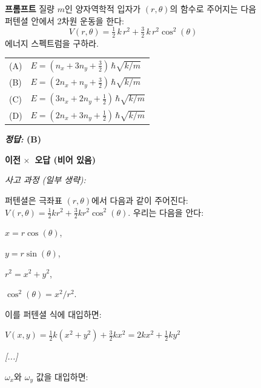 \begin{figure}[t]
\scriptsize
\begin{mdframed}[style=promptbox]
\noindent\textbf{프롬프트}
\vspace{2pt}\noindent
질량 $m$인 양자역학적 입자가 $(r, \theta)$의 함수로 주어지는 다음 퍼텐셜 안에서 2차원 운동을 한다:
%
\[
V(r, \theta) = \tfrac{1}{2}\,k\,r^2 + \tfrac{3}{2}\,k\,r^2\cos^2(\theta)
\]
%
에너지 스펙트럼을 구하라.

\vspace{2pt}
\noindent
\begin{tabular}{@{}ll@{}}
(A) & $E = (n_x + 3n_y + \tfrac{3}{2})\,\hbar\sqrt{k/m}$ \\[2pt]
(B) & $E = (2n_x + n_y + \tfrac{3}{2})\,\hbar\sqrt{k/m}$ \\[2pt]
(C) & $E = (3n_x + 2n_y + \tfrac{1}{2})\,\hbar\sqrt{k/m}$ \\[2pt]
(D) & $E = (2n_x + 3n_y + \tfrac{1}{2})\,\hbar\sqrt{k/m}$
\end{tabular}

\hfill\textbf{\textit{정답:} (B)}
\end{mdframed}
\vspace{2pt}
\noindent
\begin{minipage}[t]{0.49\textwidth}
\begin{mdframed}[style=beforebox]
\noindent\textbf{\sdrlfootnotesize 이전} \hfill {\colorbox{beforebg}{\textcolor{beforeframe}{\textbf{$\boldsymbol\times$~오답 (비어 있음)}}}}

\noindent\textit{사고 과정 (일부 생략):}
\begin{mdframed}[style=thinkbox]
퍼텐셜은 극좌표 $(r, \theta)$에서 다음과 같이 주어진다:
$V(r, \theta) = \frac{1}{2}kr^2 + \frac{3}{2}kr^2\cos^2(\theta)$.
우리는 다음을 안다:

\quad $x = r\cos(\theta)$,

\quad $y = r\sin(\theta)$,

\quad $r^2 = x^2 + y^2$,

\quad $\cos^2(\theta) = x^2/r^2$.

\smallskip
이를 퍼텐셜 식에 대입하면:

\quad $V(x,y) = \frac{1}{2}k(x^2+y^2) + \frac{3}{2}kx^2 = 2kx^2 + \frac{1}{2}ky^2$

\textit{[...]}

$\omega_x$와 $\omega_y$ 값을 대입하면:


\end{mdframed}
\end{mdframed}
\end{minipage}
\end{figure}
